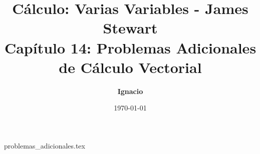 \documentclass[11pt,spanish,oneside]{report}
\title{\textbf{Cálculo: Varias Variables - James Stewart} \\ \Large Capítulo 14: Problemas Adicionales de Cálculo Vectorial}
\author{\textbf{Ignacio}}
\date{\today}
\begin{document}
\maketitle

{problemas_adicionales.tex}
\end{document}

